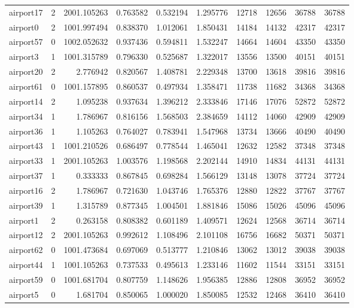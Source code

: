 \begin{longtable}{|l|r|r|r|r|r|r|r|r|r|}
airport17 & 2 & 2001.105263 & 0.763582 & 0.532194 & 1.295776 & 12718 & 12656 & 36788 & 36788 \\
airport0 & 2 & 1001.997494 & 0.838370 & 1.012061 & 1.850431 & 14184 & 14132 & 42317 & 42317 \\
airport57 & 0 & 1002.052632 & 0.937436 & 0.594811 & 1.532247 & 14664 & 14604 & 43350 & 43350 \\
airport3 & 1 & 1001.315789 & 0.796330 & 0.525687 & 1.322017 & 13556 & 13500 & 40151 & 40151 \\
airport20 & 2 & 2.776942 & 0.820567 & 1.408781 & 2.229348 & 13700 & 13618 & 39816 & 39816 \\
airport61 & 0 & 1001.157895 & 0.860537 & 0.497934 & 1.358471 & 11738 & 11682 & 34368 & 34368 \\
airport14 & 2 & 1.095238 & 0.937634 & 1.396212 & 2.333846 & 17146 & 17076 & 52872 & 52872 \\
airport34 & 1 & 1.786967 & 0.816156 & 1.568503 & 2.384659 & 14112 & 14060 & 42909 & 42909 \\
airport36 & 1 & 1.105263 & 0.764027 & 0.783941 & 1.547968 & 13734 & 13666 & 40490 & 40490 \\
airport43 & 1 & 1001.210526 & 0.686497 & 0.778544 & 1.465041 & 12632 & 12582 & 37348 & 37348 \\
airport33 & 1 & 2001.105263 & 1.003576 & 1.198568 & 2.202144 & 14910 & 14834 & 44131 & 44131 \\
airport37 & 1 & 0.333333 & 0.867845 & 0.698284 & 1.566129 & 13148 & 13078 & 37724 & 37724 \\
airport16 & 2 & 1.786967 & 0.721630 & 1.043746 & 1.765376 & 12880 & 12822 & 37767 & 37767 \\
airport39 & 1 & 1.315789 & 0.877345 & 1.004501 & 1.881846 & 15086 & 15026 & 45096 & 45096 \\
airport1 & 2 & 0.263158 & 0.808382 & 0.601189 & 1.409571 & 12624 & 12568 & 36714 & 36714 \\
airport12 & 2 & 2001.105263 & 0.992612 & 1.108496 & 2.101108 & 16756 & 16682 & 50371 & 50371 \\
airport62 & 0 & 1001.473684 & 0.697069 & 0.513777 & 1.210846 & 13062 & 13012 & 39038 & 39038 \\
airport44 & 1 & 1001.105263 & 0.737533 & 0.495613 & 1.233146 & 11602 & 11544 & 33151 & 33151 \\
airport59 & 0 & 1001.681704 & 0.807759 & 1.148626 & 1.956385 & 12886 & 12808 & 36952 & 36952 \\
airport5 & 0 & 1.681704 & 0.850065 & 1.000020 & 1.850085 & 12532 & 12468 & 36410 & 36410 \\

\end{longtable}
